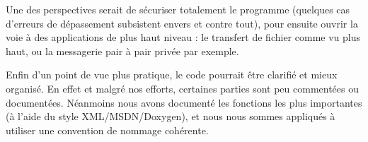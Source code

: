 \documentclass[11pt,a4paper]{article}
\begin{document}
	Une des perspectives serait de sécuriser totalement le programme (quelques cas d'erreurs de dépassement subsistent envers et contre tout), pour ensuite
	ouvrir la voie à des applications de plus haut niveau : le transfert de fichier comme vu plus haut, ou la messagerie pair à pair privée par exemple.
	
	\medskip
	
	Enfin d'un point de vue plus pratique, le code pourrait être clarifié et mieux organisé. En effet et malgré nos efforts, certaines parties sont peu commentées
	ou documentées. Néanmoins nous avons documenté les fonctions les plus importantes (à l'aide du style XML/MSDN/Doxygen), et nous nous sommes appliqués à
	utiliser une convention de nommage cohérente.
\end{document}
